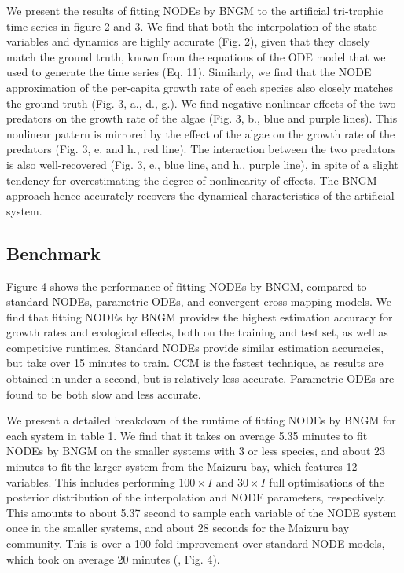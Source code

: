 \documentclass[11pt, oneside]{article}
\begin{document}
We present the results of fitting NODEs by BNGM to the artificial tri-trophic time series in figure 2 and 3.
We find that both the interpolation of the state variables and dynamics are highly accurate (Fig. 2), given that they closely match the ground truth, known from the equations of the ODE model that we used to generate the time series (Eq. 11).
Similarly, we find that the NODE approximation of the per-capita growth rate of each species also closely matches the ground truth (Fig. 3, a., d., g.). 
We find negative nonlinear effects of the two predators on the growth rate of the algae (Fig. 3, b., blue and purple lines).
This nonlinear pattern is mirrored by the effect of the algae on the growth rate of the predators (Fig. 3, e. and h., red line).
The interaction between the two predators is also well-recovered (Fig. 3, e., blue line, and h., purple line), in spite of a slight tendency for overestimating the degree of nonlinearity of effects.
The BNGM approach hence accurately recovers the dynamical characteristics of the artificial system.

\subsection{Benchmark}

Figure 4 shows the performance of fitting NODEs by BNGM, compared to standard NODEs, parametric ODEs, and convergent cross mapping models.
We find that fitting NODEs by BNGM provides the highest estimation accuracy for growth rates and ecological effects, both on the training and test set, as well as competitive runtimes. 
Standard NODEs provide similar estimation accuracies, but take over 15 minutes to train. 
CCM is the fastest technique, as results are obtained in under a second, but is relatively less accurate.
Parametric ODEs are found to be both slow and less accurate.

We present a detailed breakdown of the runtime of fitting NODEs by BNGM for each system in table 1.
We find that it takes on average 5.35 minutes to fit NODEs by BNGM on the smaller systems with 3 or less species, and about 23 minutes to fit the larger system from the Maizuru bay, which features 12 variables.
This includes performing $100 \times I$ and $30 \times I$ full optimisations of the posterior distribution of the interpolation and NODE parameters, respectively. 
This amounts to about 5.37 second to sample each variable of the NODE system once in the smaller systems, and about 28 seconds for the Maizuru bay community.
This is over a 100 fold improvement over standard NODE models, which took on average 20 minutes (\cite{Bonnaffe2021a}, Fig. 4).
\end{document}
